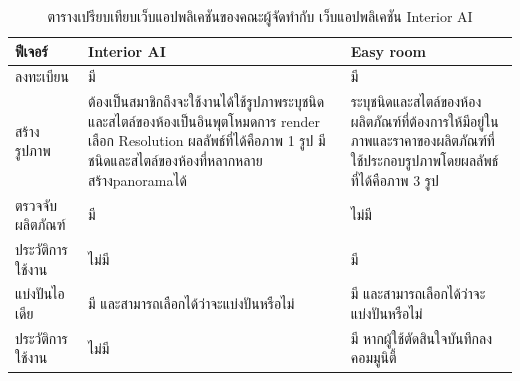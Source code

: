 \documentclass[12pt,oneside,openright,a4paper]{cpe-thai-project}
\begin{document}
\begin{table}[!h]
  \caption{ตารางเปรียบเทียบเว็บแอปพลิเคชันของคณะผู้จัดทำกับ เว็บแอปพลิเคชัน Interior AI }\label{tbl:interior-ai-table}
  \begin{tabular}{|p{4cm}|p{5cm}|p{5cm}|}
    \hline
    \textbf{ฟีเจอร์} & \textbf{ Interior AI}                                                                                                                             & \textbf{Easy room }                                                                            \\
    \hline
    ลงทะเบียน       & มี                                                                                                                                                 & มี                                                                                              \\
    \hline
    สร้างรูปภาพ      & ต้องเป็นสมาชิกถึงจะใช้งานได้ใช้รูปภาพระบุชนิดและสไตล์ของห้องเป็นอินพุตโหมดการ render เลือก Resolution ผลลัพธ์ที่ได้คือภาพ 1 รูป มีชนิดและสไตล์ของห้องที่หลากหลายสร้างpanoramaได้ & ระบุชนิดและสไตล์ของห้อง ผลิตภัณฑ์ที่ต้องการให้มีอยู่ในภาพและราคาของผลิตภัณฑ์ที่ใช้ประกอบรูปภาพโดยผลลัพธ์ที่ได้คือภาพ 3 รูป \\
    \hline
    ตรวจจับผลิตภัณฑ์   & มี                                                                                                                                                 & ไม่มี                                                                                            \\
    \hline
    ประวัติการใช้งาน  & ไม่มี                                                                                                                                               & มี                                                                                              \\
    \hline
    แบ่งปันไอเดีย     & มี และสามารถเลือกได้ว่าจะแบ่งปันหรือไม่                                                                                                                   & มี และสามารถเลือกได้ว่าจะแบ่งปันหรือไม่                                                                \\
    \hline
    ประวัติการใช้งาน  & ไม่มี                                                                                                                                               & มี หากผู้ใช้ตัดสินใจบันทึกลงคอมมูนิตี้                                                                     \\
    \hline
  \end{tabular}
\end{table}
\end{document}
